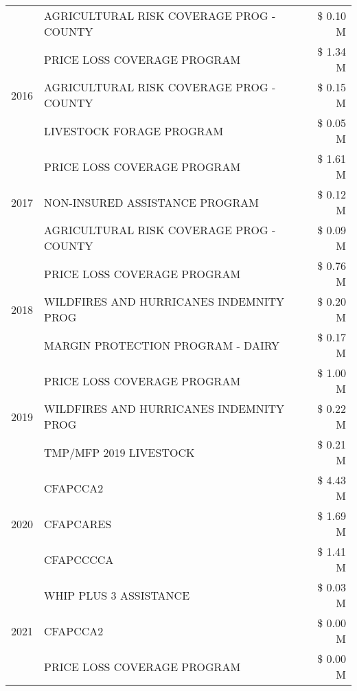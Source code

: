\begin{tabular}{llr}
 & AGRICULTURAL RISK COVERAGE PROG - COUNTY & \$ 0.10 M \\
\cline{1-3}
\multirow[t]{3}{*}{2016} & PRICE LOSS COVERAGE PROGRAM                   & \$ 1.34 M \\
 & AGRICULTURAL RISK COVERAGE PROG - COUNTY      & \$ 0.15 M \\
 & LIVESTOCK FORAGE PROGRAM                      & \$ 0.05 M \\
\cline{1-3}
\multirow[t]{3}{*}{2017} & PRICE LOSS COVERAGE PROGRAM & \$ 1.61 M \\
 & NON-INSURED ASSISTANCE PROGRAM & \$ 0.12 M \\
 & AGRICULTURAL RISK COVERAGE PROG - COUNTY & \$ 0.09 M \\
\cline{1-3}
\multirow[t]{3}{*}{2018} & PRICE LOSS COVERAGE PROGRAM & \$ 0.76 M \\
 & WILDFIRES AND HURRICANES INDEMNITY PROG & \$ 0.20 M \\
 & MARGIN PROTECTION PROGRAM - DAIRY & \$ 0.17 M \\
\cline{1-3}
\multirow[t]{3}{*}{2019} & PRICE LOSS COVERAGE PROGRAM & \$ 1.00 M \\
 & WILDFIRES AND HURRICANES INDEMNITY PROG & \$ 0.22 M \\
 & TMP/MFP 2019 LIVESTOCK & \$ 0.21 M \\
\cline{1-3}
\multirow[t]{3}{*}{2020} & CFAPCCA2 & \$ 4.43 M \\
 & CFAPCARES & \$ 1.69 M \\
 & CFAPCCCCA & \$ 1.41 M \\
\cline{1-3}
\multirow[t]{3}{*}{2021} & WHIP PLUS 3 ASSISTANCE & \$ 0.03 M \\
 & CFAPCCA2 & \$ 0.00 M \\
 & PRICE LOSS COVERAGE PROGRAM & \$ 0.00 M \\
\cline{1-3}
\bottomrule
\end{tabular}
